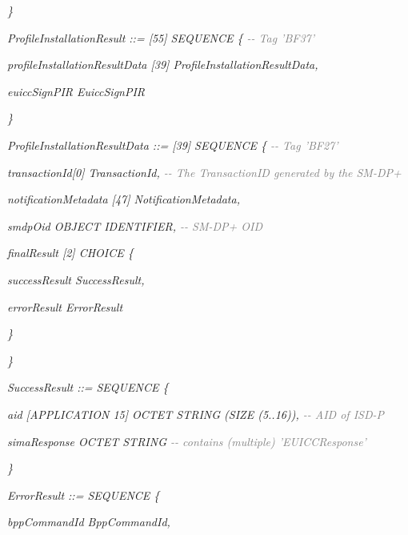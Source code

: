 \documentclass[10pt, oneside]{book}
\begin{document}
\textit{\}\\}

\textit{ProfileInstallationResult ::= [55] SEQUENCE \{ \textcolor{gray}{{-}{-} Tag 'BF37'}}

\hspace{0.75cm} \textit{profileInstallationResultData [39] ProfileInstallationResultData,}

\hspace{0.75cm} \textit{euiccSignPIR EuiccSignPIR}

\textit{\}\\}

\textit{ProfileInstallationResultData ::= [39] SEQUENCE \{ \textcolor{gray}{{-}{-} Tag 'BF27'}}

\hspace{0.75cm} \textit{transactionId[0] TransactionId, \textcolor{gray}{{-}{-} The TransactionID generated by the SM-DP+}}

\hspace{0.75cm} \textit{notificationMetadata [47] NotificationMetadata,}

\hspace{0.75cm} \textit{smdpOid OBJECT IDENTIFIER, \textcolor{gray}{{-}{-} SM-DP+ OID}}

\hspace{0.75cm} \textit{finalResult [2] CHOICE \{}

\hspace{1.5cm} \textit{successResult SuccessResult,}

\hspace{1.5cm} \textit{errorResult ErrorResult}

\hspace{0.75cm} \textit{\}}

\textit{\}\\}

\textit{SuccessResult ::= SEQUENCE \{}

\hspace{0.75cm} \textit{aid [APPLICATION 15] OCTET STRING (SIZE (5..16)), \textcolor{gray}{{-}{-} AID of ISD-P}}

\hspace{0.75cm} \textit{simaResponse OCTET STRING \textcolor{gray}{{-}{-} contains (multiple) 'EUICCResponse'}}

\textit{\}\\}

\textit{ErrorResult ::= SEQUENCE \{}

\hspace{0.75cm} \textit{bppCommandId BppCommandId,}
\end{document}
